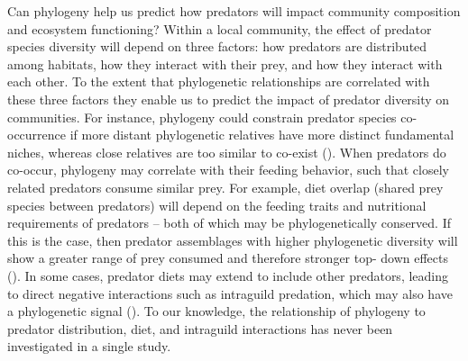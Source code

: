 \documentclass[11pt]{article}
\begin{document}
Can phylogeny help us predict how predators will impact community composition and ecosystem functioning? Within a local community, the effect of predator species diversity will
depend on three factors: how predators are distributed among habitats,
how they interact with their prey, and how they interact with each other. To the extent that phylogenetic relationships are
correlated with these three factors they enable us to predict the impact
of predator diversity on communities. For instance, phylogeny could
constrain predator species co-occurrence if more distant phylogenetic
relatives have more distinct fundamental niches, whereas close relatives
are too similar to co-exist (\citealt{Webb2002, Emerson2008}). When
predators do co-occur, phylogeny may correlate with their feeding
behavior, such that closely related predators consume similar prey. For
example, diet overlap (shared prey species between predators) will
depend on the feeding traits and nutritional requirements of predators
-- both of which may be phylogenetically conserved. If this is the case,
then predator assemblages with higher phylogenetic diversity will show a
greater range of prey consumed and therefore stronger top- down effects
(\citealt{Finke2008a}). In some cases, predator diets may extend to include
other predators, leading to direct negative interactions such as
intraguild predation, which may also have a phylogenetic signal
(\citealt{Pfennig2000}). To our knowledge, the relationship of phylogeny to
predator distribution, diet, and intraguild interactions has never been
investigated in a single study.
\end{document}

